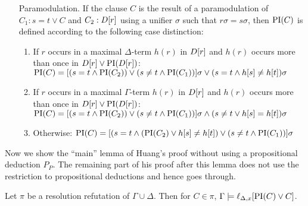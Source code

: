 \documentclass[,%
	paper=a4,%
	DIV14, 
	liststotoc,
	bibtotoc,
	draft=false,%
	numbers=noendperiod
]{scrartcl}
\newcommand{\lif}[1]{\lift{\Delta}{#1}{x}}
\begin{document}
\begin{defi}
\begin{itemize}
    \item[Paramodulation.]
  \label{def:PI_paramod}
      If the clause $C$ is the result of a paramodulation of $C_1: s=t \lor C$ and $C_2: D[r]$ using a unifier $\sigma$ such that $r\sigma = s\sigma$, then $\operatorname{PI}(C)$ is defined according to the following  case distinction:
      \begin{enumerate}
        \item If $r$ occurs in a maximal $\Delta$-term $h(r)$ in $D[r]$ and $h(r)$ occurs more than once in $D[r] \lor \operatorname{PI}(D[r])$:
          \label{def:PI_paramod_1}
          \newline
          $\operatorname{PI}(C) = [ ( s=t \land \operatorname{PI}(C_2) ) \lor (s\neq t \land \operatorname{PI}(C_1)) ]\sigma \lor (s=t \land h[s] \neq h[t])\sigma$
        \item If $r$ occurs in a maximal $\Gamma$-term $h(r)$ in $D[r]$ and $h(r)$ occurs more than once in $D[r] \lor \operatorname{PI}(D[r])$:
          \label{def:PI_paramod_2}
          \newline
          $\operatorname{PI}(C) = [ ( s=t \land \operatorname{PI}(C_2) ) \lor (s\neq t \land \operatorname{PI}(C_1)) ]\sigma \land (s\neq t \lor h[s] = h[t])\sigma$
        \item Otherwise:
          \label{def:PI_paramod_3}
          \newline
          $\operatorname{PI}(C) = [ ( s=t \land (\operatorname{PI}(C_2) \lor h[s] \neq h[t] ) \lor (s\neq t \land \operatorname{PI}(C_1)) ]\sigma$ \qedhere

      \end{enumerate}
  \end{itemize}
\end{defi}


Now we show the ``main'' lemma of Huang's proof without using a propositional deduction $P_P$.
The remaining part of his proof after this lemma does not use the restriction to propositional deductions and hence goes through.

\begin{lemma}
	Let $\pi$ be a resolution refutation of $\Gamma \cup \Delta$.
	Then for $C \in \pi$,
	$ \Gamma \entails \lif{\PI(C) \lor C} $.
	\label{lemma:gamma_entails_interpolant}
\end{lemma}
\end{document}
